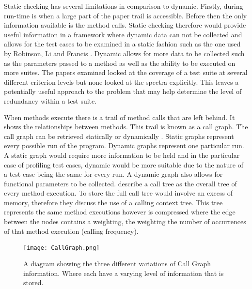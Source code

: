 Static checking has several limitations in comparison to dynamic. Firstly, during run-time is when a large part of the paper trail is accessible. Before then the only information available is the method calls.  Static checking therefore would provide useful information in a framework where dynamic data can not be collected and allows for the test cases to be examined in a static fashion such as the one used by Robinson, Li and Francis \cite{li2008static}. Dynamic allows for more data to be collected such as the parameters passed to a method as well as the ability to be executed on more suites. The papers examined looked at the coverage of a test suite at several different criterion levels but none looked at the spectra explicitly. This leaves a potentially useful approach to the problem that may help determine the level of redundancy within a test suite. 

When methods execute there is a trail of method calls that are left behind. It shows the relationships between methods. This trail is known as a call graph. The call graph can be retrieved statically or dynamically \cite{graham1982gprof}. Static graphs represent every possible run of the program. Dynamic graphs represent one particular run. A static graph would require more information to be held and in the particular case of profiling test cases, dynamic would be more suitable due to the nature of a test case being the same for every run. A dynamic graph also allows for functional parameters to be collected. \cite{Zhuang06accurate} describe a call tree as the overall tree of every method execution. To store the full call tree would involve an excess of memory, therefore they discuss the use of a calling context tree. This tree represents the same method executions however is compressed where the edge between the nodes contains a weighting, the weighting the number of occurrences of that method execution (calling frequency).

\begin{figure}[h]
\begin{center}
\texttt{[image: CallGraph.png]}
\end{center}
\caption{A diagram showing the three different variations of Call Graph information. Where  each have a varying level of information that is stored.}
\label{fig:callgraph}
\end{figure}


